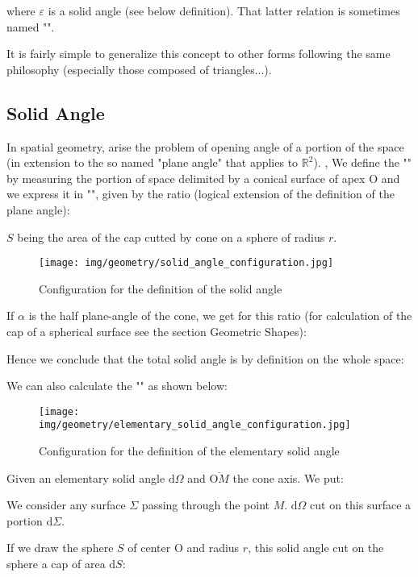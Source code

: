	where $\varepsilon$ is a solid angle (see below definition). That latter relation is sometimes named "".
	
	It is fairly simple to generalize this concept to other forms following the same philosophy (especially those composed of triangles...).
	
	\subsection{Solid Angle}\label{solid angle}
	In spatial geometry, arise the problem of opening angle of a portion of the space (in extension to the so named "plane angle" that applies to $\mathbb{R}^2$). , We define the "" by measuring the portion of space delimited by a conical surface of apex $\text{O}$ and we express it in "", given by the ratio (logical extension of the definition of the plane angle):
	
	$S$ being the area of the cap cutted by cone on a sphere of radius $r$.
	
	\begin{figure}[H]
		\centering
		\texttt{[image: img/geometry/solid\_angle\_configuration.jpg]}
		\caption{Configuration for the definition of the solid angle}
	\end{figure}
	If $\alpha$ is the half plane-angle of the cone, we get for this ratio (for calculation of the cap of a spherical surface see the section Geometric Shapes):
	
	Hence we conclude that the total solid angle is by definition on the whole space:
	
	We can also calculate the "" as shown below:
	\begin{figure}[H]
		\centering
		\texttt{[image: img/geometry/elementary\_solid\_angle\_configuration.jpg]}
		\caption{Configuration for the definition of the elementary solid angle}
	\end{figure}
	Given an elementary solid angle $\mathrm{d}\Omega$ and $\overline{\text{O}M}$ the cone axis. We put:
	
	We consider any surface $\Sigma$ passing through the point $M$. $\mathrm{d}\Omega$ cut on this surface a portion $\mathrm{d}\Sigma$.
	
	If we draw the sphere $S$ of center $\text{O}$ and radius $r$, this solid angle cut on the sphere a cap of area $\mathrm{d}S$:
	
